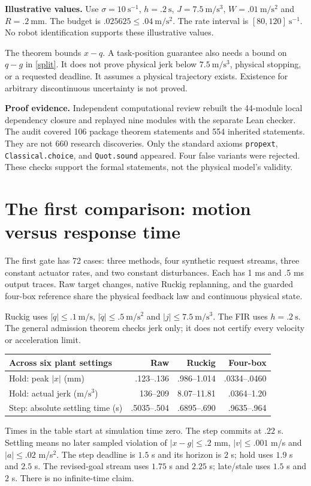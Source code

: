 \documentclass[11pt,letterpaper]{article}
\begin{document}
\textbf{Illustrative values.} Use $\sigma=10\ \mathrm{s}^{-1}$, $h=.2\ \mathrm{s}$, $J=7.5\ \mathrm{m/s^3}$, $W=.01\ \mathrm{m/s^2}$ and $R=.2\ \mathrm{mm}$. The budget is $.025625\leq.04\ \mathrm{m/s^2}$. The rate interval is $[80,120]\ \mathrm{s}^{-1}$. No robot identification supports these illustrative values.

The theorem bounds $x-q$. A task-position guarantee also needs a bound on $q-g$ in \eqref{split}. It does not prove physical jerk below $7.5\ \mathrm{m/s^3}$, physical stopping, or a requested deadline. It assumes a physical trajectory exists. Existence for arbitrary discontinuous uncertainty is not proved.

\textbf{Proof evidence.} Independent computational review rebuilt the 44-module local dependency closure and replayed nine modules with the separate Lean checker. The audit covered 106 package theorem statements and 554 inherited statements. They are not 660 research discoveries. Only the standard axioms \texttt{propext}, \texttt{Classical.choice}, and \texttt{Quot.sound} appeared. Four false variants were rejected. These checks support the formal statements, not the physical model's validity.

\newpage
\section{The first comparison: motion versus response time}
The first gate has 72 cases: three methods, four synthetic request streams, three constant actuator rates, and two constant disturbances. Each has 1 ms and .5 ms output traces. Raw target changes, native Ruckig replanning, and the guarded four-box reference share the physical feedback law and continuous physical state.

Ruckig uses $|\dot q|\leq.1\ \mathrm{m/s}$, $|\ddot q|\leq.5\ \mathrm{m/s^2}$ and $|j|\leq7.5\ \mathrm{m/s^3}$. The FIR uses $h=.2\ \mathrm{s}$. The general admission theorem checks jerk only; it does not certify every velocity or acceleration limit.

\begin{center}\small
\begin{tabular}{lrrr}
\toprule
Across six plant settings & Raw & Ruckig & Four-box\\
\midrule
Hold: peak $|x|$ (mm) & .123--.136 & .986--1.014 & .0334--.0460\\
Hold: actual jerk ($\mathrm{m/s^3}$) & 136--209 & 8.07--11.81 & .0364--1.20\\
Step: absolute settling time (s) & .5035--.504 & .6895--.690 & .9635--.964\\
\bottomrule
\end{tabular}
\end{center}
Times in the table start at simulation time zero. The step commits at $.22$ s. Settling means no later sampled violation of $|x-g|\leq.2$ mm, $|v|\leq.001$ m/s and $|a|\leq.02$ m/s$^2$. The step deadline is $1.5$ s and its horizon is $2$ s; hold uses $1.9$ s and $2.5$ s. The revised-goal stream uses $1.75$ s and $2.25$ s; late/stale uses $1.5$ s and $2$ s. There is no infinite-time claim.
\end{document}

